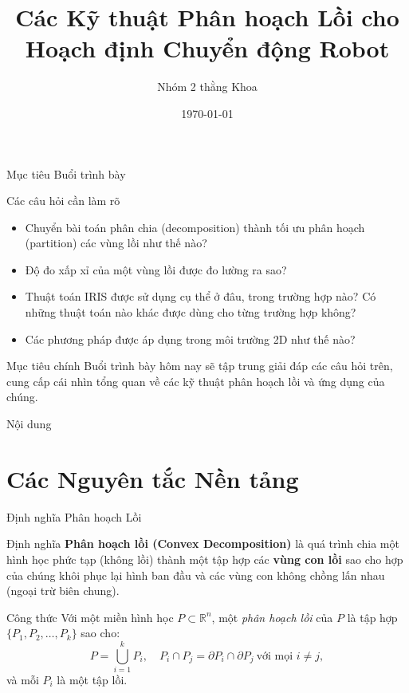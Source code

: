 \documentclass[aspectratio=169]{beamer}
\title{Các Kỹ thuật Phân hoạch Lồi cho Hoạch định Chuyển động Robot}
\author{Nhóm 2 thằng Khoa}
\date{\today}
\begin{document}
\frame{\titlepage}

\begin{frame}{Mục tiêu Buổi trình bày}
    \begin{block}{Các câu hỏi cần làm rõ}
        \begin{itemize}
            \item Chuyển bài toán phân chia (decomposition) thành tối ưu phân hoạch (partition)
                  các vùng lồi như thế nào?
            \item Độ đo xấp xỉ của một vùng lồi được đo lường ra sao?
            \item Thuật toán IRIS được sử dụng cụ thể ở đâu, trong trường hợp nào? Có những thuật
                  toán nào khác được dùng cho từng trường hợp không?
            \item Các phương pháp được áp dụng trong môi trường 2D như thế nào?
        \end{itemize}
    \end{block}
    \begin{alertblock}{Mục tiêu chính}
        Buổi trình bày hôm nay sẽ tập trung giải đáp các câu hỏi trên, cung cấp cái nhìn tổng quan về các kỹ thuật phân hoạch lồi và ứng dụng của chúng.
    \end{alertblock}
\end{frame}

\begin{frame}{Nội dung}
    \tableofcontents
\end{frame}

\section{Các Nguyên tắc Nền tảng}

\begin{frame}{Định nghĩa Phân hoạch Lồi}

    \begin{block}{Định nghĩa}
        \textbf{Phân hoạch lồi (Convex Decomposition)} là quá trình chia một hình học phức tạp (không lồi) thành một tập hợp các \textbf{vùng con lồi} sao cho hợp của chúng khôi phục lại hình ban đầu và các vùng con không chồng lấn nhau (ngoại trừ biên chung).
    \end{block}

    \begin{block}{Công thức}
        Với một miền hình học $P\subset\mathbb{R}^n$, một \textit{phân hoạch lồi} của $P$ là tập hợp $\{P_1, P_2, \dots, P_k\}$ sao cho:
        \[
            P = \bigcup_{i=1}^{k} P_i, \quad
            P_i \cap P_j = \partial P_i \cap \partial P_j \ \text{với mọi } i \ne j,
        \]
        và mỗi $P_i$ là một tập lồi.
    \end{block}

\end{frame}
\end{document}
